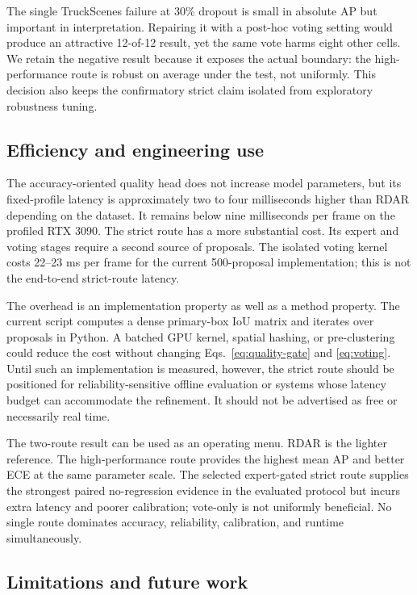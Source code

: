 \documentclass[preprint,12pt,times]{elsarticle}
\begin{document}
The single TruckScenes failure at 30\% dropout is small in absolute AP but
important in interpretation. Repairing it with a post-hoc voting setting would
produce an attractive 12-of-12 result, yet the same vote harms eight other
cells. We retain the negative result because it exposes the actual boundary:
the high-performance route is robust on average under the test, not uniformly.
This decision also keeps the confirmatory strict claim isolated from
exploratory robustness tuning.

\subsection{Efficiency and engineering use}

The accuracy-oriented quality head does not increase model parameters, but its
fixed-profile latency is approximately two to four milliseconds higher than
RDAR depending on the dataset. It remains below nine milliseconds per frame
on the profiled RTX 3090. The strict route has a more substantial cost. Its
expert and voting stages require a second source of proposals. The isolated
voting kernel costs 22--23 ms per frame for the current 500-proposal
implementation; this is not the end-to-end strict-route latency.

The overhead is an implementation property as well as a method property. The
current script computes a dense primary-box IoU matrix and iterates over
proposals in Python. A batched GPU kernel, spatial hashing, or pre-clustering
could reduce the cost without changing Eqs.~\eqref{eq:quality-gate} and
\eqref{eq:voting}. Until such an implementation is measured, however, the
strict route should be positioned for reliability-sensitive offline evaluation
or systems whose latency budget can accommodate the refinement. It should not
be advertised as free or necessarily real time.

The two-route result can be used as an operating menu. RDAR is the lighter
reference. The high-performance route provides the highest mean AP and better
ECE at the same parameter scale. The selected expert-gated strict route
supplies the strongest paired no-regression evidence in the evaluated protocol
but incurs extra latency and poorer calibration; vote-only is not uniformly
beneficial. No
single route dominates accuracy, reliability, calibration, and runtime
simultaneously.

\subsection{Limitations and future work}
\end{document}
